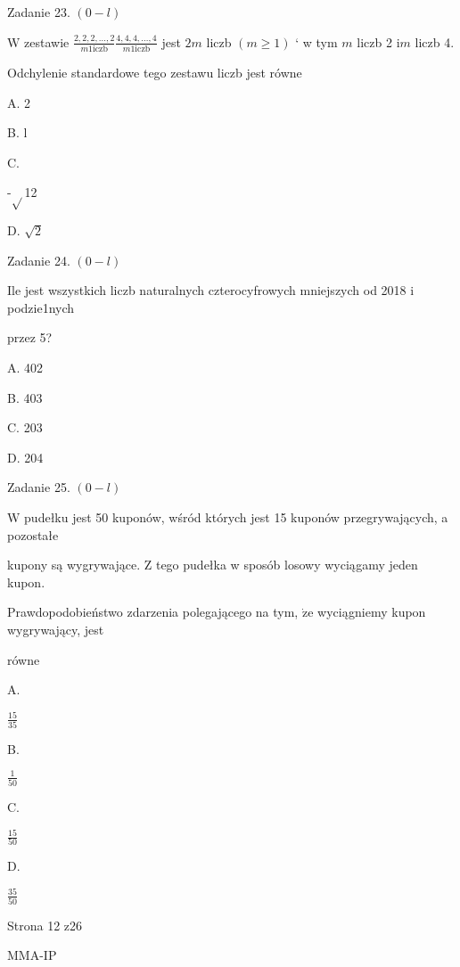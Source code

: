 \documentclass[a4paper,12pt]{article}
\begin{document}
Zadanie 23. $(0-l)$

$\mathrm{W}$ zestawie $\displaystyle \frac{2,2,2,\ldots,2}{m1\mathrm{i}\mathrm{c}\mathrm{z}\mathrm{b}}\frac{4,4,4,\ldots,4}{m1\mathrm{i}\mathrm{c}\mathrm{z}\mathrm{b}}$ jest $2m$ liczb $(m\geq 1)$ ` w tym $m$ liczb 2 $\mathrm{i} m$ liczb 4.

Odchylenie standardowe tego zestawu liczb jest równe

A. 2

B. l

C.

-$\sqrt{}$12

D. $\sqrt{2}$

Zadanie 24. $(0-l)$

Ile jest wszystkich liczb naturalnych czterocyfrowych mniejszych od 2018 i podzie1nych

przez 5?

A. 402

B. 403

C. 203

D. 204

Zadanie 25. $(0-l)$

$\mathrm{W}$ pudełku jest 50 kuponów, wśród których jest 15 kuponów przegrywających, a pozostałe

kupony są wygrywające. $\mathrm{Z}$ tego pudełka w sposób losowy wyciągamy jeden kupon.

Prawdopodobieństwo zdarzenia polegającego na tym, $\dot{\mathrm{z}}\mathrm{e}$ wyciągniemy kupon wygrywający, jest

równe

A.

$\displaystyle \frac{15}{35}$

B.

$\displaystyle \frac{1}{50}$

C.

$\displaystyle \frac{15}{50}$

D.

$\displaystyle \frac{35}{50}$

Strona 12 z26

MMA-IP
\end{document}
